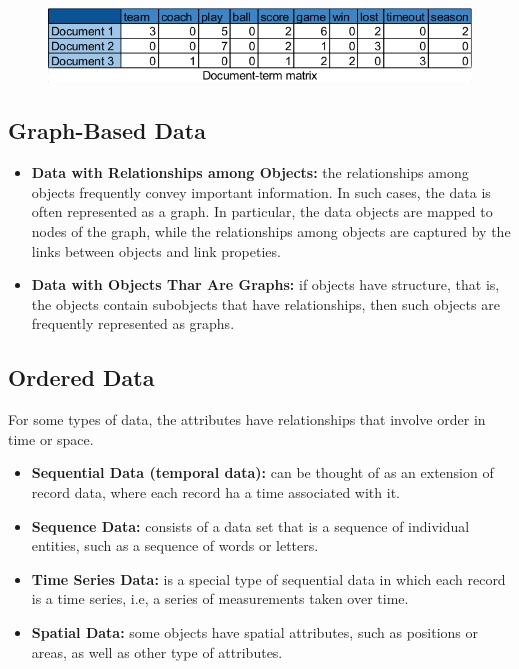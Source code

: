 		\begin{figure}[H]
			\centering
			\includegraphics[scale=0.5]{pics/DocumentTermMatrix.png}
		\end{figure}

		\subsection{Graph-Based Data}
			\begin{itemize}
				\item {\bf Data with Relationships among Objects:} the relationships among objects frequently convey important information. In such cases, the data is often represented as a graph. In 
				particular, the data objects are mapped to nodes of the graph, while the relationships among
				objects are captured by the links between objects and link propeties. 
				\item {\bf Data with Objects Thar Are Graphs:} if objects have structure, that is, the objects
				contain subobjects that have relationships, then such objects are frequently represented as graphs.
			\end{itemize}

		\clearpage
		\subsection{Ordered Data}
		For some types of data, the attributes have relationships that involve order in time or space. 
			\begin{itemize}
				\item {\bf Sequential Data (temporal data):} can be thought of as an extension of record data, 
				where each record ha a time associated with it. 
				\item {\bf Sequence Data:} consists of a data set that is a sequence of individual entities, 
				such as a sequence of words or letters. 
				\item {\bf Time Series Data:} is a special type of sequential data in which each record is a
				time series, i.e, a series of measurements taken over time. 
				\item {\bf Spatial Data:} some objects have spatial attributes, such as positions or areas, as
				well as other type of attributes. 
			\end{itemize}


